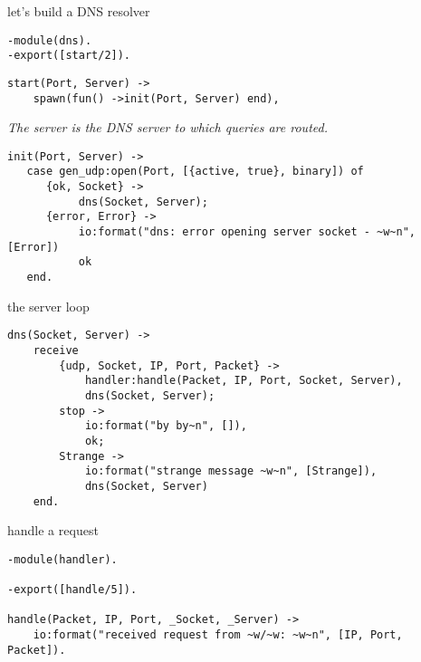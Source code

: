 \begin{frame}[fragile]{let's build a DNS resolver}
 
\pause

\begin{verbatim}
-module(dns).
-export([start/2]).
\end{verbatim}

\begin{verbatim}
start(Port, Server) ->
    spawn(fun() ->init(Port, Server) end),
\end{verbatim}

\vspace{10pt}\pause
{\em The server is the DNS server to which queries are routed.}

\pause

\begin{verbatim}
init(Port, Server) ->
   case gen_udp:open(Port, [{active, true}, binary]) of
      {ok, Socket} ->
           dns(Socket, Server);
      {error, Error} ->
           io:format("dns: error opening server socket - ~w~n", [Error])
           ok
   end.
\end{verbatim}


\end{frame}

\begin{frame}[fragile]{the server loop}

\begin{verbatim}
dns(Socket, Server) ->
    receive 
        {udp, Socket, IP, Port, Packet} ->
            handler:handle(Packet, IP, Port, Socket, Server),
            dns(Socket, Server);
        stop ->
            io:format("by by~n", []),
            ok;
        Strange ->
            io:format("strange message ~w~n", [Strange]),
            dns(Socket, Server)
    end.
\end{verbatim}

\end{frame}


\begin{frame}[fragile]{handle a request}

\pause
\begin{verbatim}
-module(handler).

-export([handle/5]).

handle(Packet, IP, Port, _Socket, _Server) ->    
    io:format("received request from ~w/~w: ~w~n", [IP, Port, Packet]).
\end{verbatim}

\vspace{20pt}

\end{frame}


